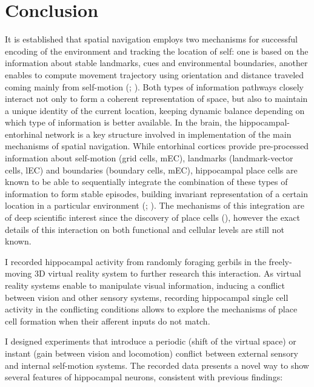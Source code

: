 \chapter{Conclusion}

It is established that spatial navigation employs two mechanisms for successful encoding of the environment and tracking the location of self: one is based on the information about stable landmarks, cues and environmental boundaries, another enables to compute movement trajectory using orientation and distance traveled coming mainly from self-motion (\cite{OKeefe1978}; \cite{Buzsaki2013}). Both types of information pathways closely interact not only to form a coherent representation of space, but also to maintain a unique identity of the current location, keeping dynamic balance depending on which type of information is better available. In the brain, the hippocampal-entorhinal network is a key structure involved in implementation of the main mechanisms of spatial navigation. While entorhinal cortices provide pre-processed information about self-motion (grid cells, mEC), landmarks (landmark-vector cells, lEC) and boundaries (boundary cells, mEC), hippocampal place cells are known to be able to sequentially integrate the combination of these types of information to form stable episodes, building invariant representation of a certain location in a particular environment (\cite{Moser2008}; \cite{Moser2015}). The mechanisms of this integration are of deep scientific interest since the discovery of place cells (\cite{OKEEFE1971171}), however the exact details of this interaction on both functional and cellular levels are still not known.

I recorded hippocampal activity from randomly foraging gerbils in the freely-moving 3D virtual reality system to  further research this interaction. As virtual reality systems enable to manipulate visual information, inducing a conflict between vision and other sensory systems, recording hippocampal single cell activity in the conflicting conditions allows to explore the mechanisms of place cell formation when their afferent inputs do not match.

I designed experiments that introduce a periodic (shift of the virtual space) or instant (gain between vision and locomotion) conflict between external sensory and internal self-motion systems. The recorded data presents a novel way to show several features of hippocampal neurons, consistent with previous findings:

